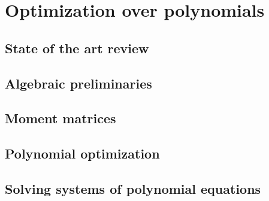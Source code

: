 \chapter{Optimization over polynomials}

\section{State of the art review}

\section{Algebraic preliminaries}

\section{Moment matrices}

\section{Polynomial optimization}

\section{Solving systems of polynomial equations}
